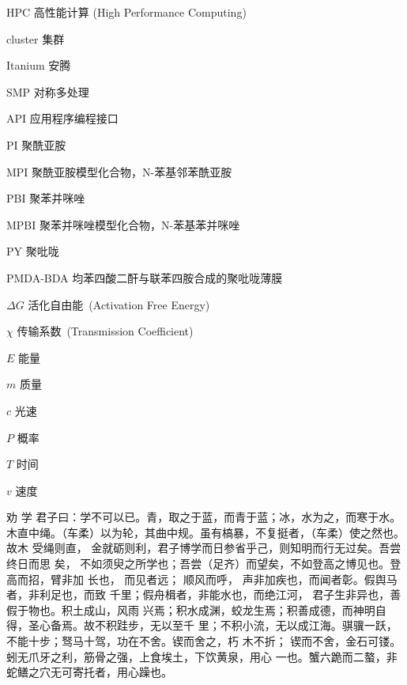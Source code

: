 \begin{denotation}

\item[HPC] 高性能计算 (High Performance Computing)
\item[cluster] 集群
\item[Itanium] 安腾
\item[SMP] 对称多处理
\item[API] 应用程序编程接口
\item[PI]	聚酰亚胺
\item[MPI]	聚酰亚胺模型化合物，N-苯基邻苯酰亚胺
\item[PBI]	聚苯并咪唑
\item[MPBI]	聚苯并咪唑模型化合物，N-苯基苯并咪唑
\item[PY]	聚吡咙
\item[PMDA-BDA]	均苯四酸二酐与联苯四胺合成的聚吡咙薄膜
\item[$\Delta G$]  	活化自由能~(Activation Free Energy)
\item [$\chi$] 传输系数~(Transmission Coefficient)
\item[$E$] 能量
\item[$m$] 质量
\item[$c$] 光速
\item[$P$] 概率
\item[$T$] 时间
\item[$v$] 速度
\item[劝  学] 君子曰：学不可以已。青，取之于蓝，而青于蓝；冰，水为之，而寒于水。
  木直中绳。（车柔）以为轮，其曲中规。虽有槁暴，不复挺者，（车柔）使之然也。故木
  受绳则直， 金就砺则利，君子博学而日参省乎己，则知明而行无过矣。吾尝终日而思
  矣，  不如须臾之所学也；吾尝（足齐）而望矣，不如登高之博见也。登高而招，臂非加
  长也，  而见者远；  顺风而呼，  声非加疾也，而闻者彰。假舆马者，非利足也，而致
  千里；假舟楫者，非能水也，而绝江河，  君子生非异也，善假于物也。积土成山，风雨
  兴焉；积水成渊，蛟龙生焉；积善成德，而神明自得，圣心备焉。故不积跬步，无以至千
  里；不积小流，无以成江海。骐骥一跃，不能十步；驽马十驾，功在不舍。锲而舍之，朽
  木不折；  锲而不舍，金石可镂。蚓无爪牙之利，筋骨之强，上食埃土，下饮黄泉，用心
  一也。蟹六跪而二螯，非蛇鳝之穴无可寄托者，用心躁也。
\end{denotation}
